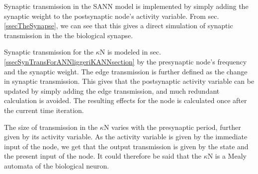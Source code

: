 		Synaptic transmission in the SANN model is implemented by simply adding the synaptic weight to the postsynaptic node's activity variable.
		From sec. \ref{ssecTheSynapse}, we can see that this gives a direct simulation of synaptic transmission in the the biological synapse.

		Synaptic transmission for the $\kappa$N is modeled in sec. \ref{ssecSynTransForANNliggeriKANNsection} by the presynaptic node's frequency and the synaptic weight.
		The edge transmission is further defined as the change in synaptic transmission. %
		This gives that the postsynaptic activity variable can be updated by simply adding the edge transmission, and much redundant calculation is avoided.
		The resulting effects for the node is calculated once after the current time iteration.

		

		The size of transmission in the $\kappa$N varies with the presynaptic period, further given by its activity variable.
		As the activity variable is given by the immediate input of the node, we get that the output transmission is given by the state and the present input of the node.
		It could therefore be said that the $\kappa$N is a Mealy automata of the biological neuron.
	


